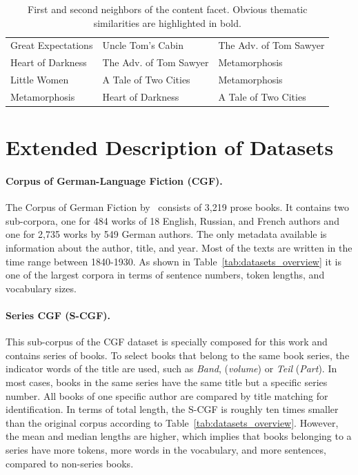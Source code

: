 \documentclass[11pt]{article}
\begin{document}
\begin{table}
\begin{tabular}{lll}
		Great Expectations &                   Uncle Tom's Cabin &        The Adv. of Tom Sawyer \\
		Heart of Darkness &        The Adv. of Tom Sawyer &                       Metamorphosis \\
		Little Women &                A Tale of Two Cities &                       Metamorphosis \\
		Metamorphosis &                   Heart of Darkness &                A Tale of Two Cities \\
		\bottomrule
	\end{tabular}
	\caption[First and Second Neighbors of the Content Facet.]{First and second neighbors of the content facet. Obvious thematic similarities are highlighted in bold.}
	\label{tab:content_qualitative}
\end{table}

\section{Extended Description of Datasets}

\paragraph{Corpus of German-Language Fiction (CGF).}
The Corpus of German Fiction by~\citet{fischer_corpus_2017} consists of 3,219 prose books.
It contains two sub-corpora, one for 484 works of 18 English, Russian, and French authors and one for 2,735 works by 549 German authors.
The only metadata available is information about the author, title, and year.
Most of the texts are written in the time range between 1840-1930.
As shown in Table~\ref{tab:datasets_overview} it is one of the largest corpora in terms of sentence numbers, token lengths, and vocabulary sizes.

\paragraph{Series CGF (S-CGF).}
This sub-corpus of the CGF dataset is specially composed for this work and contains series of books.
To select books that belong to the same book series, the indicator words of the title are used, such as \textit{Band}, (\textit{volume}) or \textit{Teil} (\textit{Part}).
In most cases, books in the same series have the same title but a specific series number.
All books of one specific author are compared by title matching for identification.
In terms of total length, the S-CGF is roughly ten times smaller than the original corpus according to Table~\ref{tab:datasets_overview}.
However, the mean and median lengths are higher, which implies that books belonging to a series have more tokens, more words in the vocabulary, and more sentences, compared to non-series books.
\end{document}
